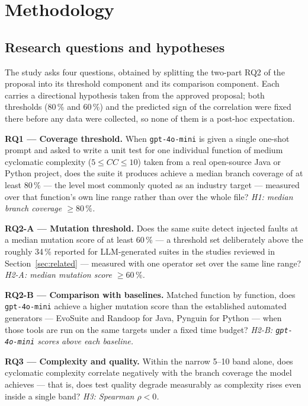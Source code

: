\section{Methodology}\label{sec:method}

\subsection{Research questions and hypotheses}\label{sec:rqs}

The study asks four questions, obtained by splitting the two-part RQ2 of the proposal into
its threshold component and its comparison component. Each carries a directional hypothesis
taken from the approved proposal; both thresholds (80\,\% and 60\,\%) and the predicted sign
of the correlation were fixed there before any data were collected, so none of them is a
post-hoc expectation.

\textbf{RQ1 --- Coverage threshold.} When \texttt{gpt-4o-mini} is given a single one-shot
prompt and asked to write a unit test for one individual function of medium cyclomatic
complexity ($5 \le CC \le 10$) taken from a real open-source Java or Python project, does the
suite it produces achieve a median branch coverage of at least 80\,\% --- the level most
commonly quoted as an industry target --- measured over that function's own line range rather
than over the whole file?
\emph{H1: median branch coverage $\ge 80\,\%$.}

\textbf{RQ2-A --- Mutation threshold.} Does the same suite detect injected faults at a median
mutation score of at least 60\,\% --- a threshold set deliberately above the roughly 34\,\%
reported for LLM-generated suites in the studies reviewed in Section~\ref{sec:related} ---
measured with one operator set over the same line range?
\emph{H2-A: median mutation score $\ge 60\,\%$.}

\textbf{RQ2-B --- Comparison with baselines.} Matched function by function, does
\texttt{gpt-4o-mini} achieve a higher mutation score than the established automated generators
--- EvoSuite and Randoop for Java, Pynguin for Python --- when those tools are run on the same
targets under a fixed time budget?
\emph{H2-B: \texttt{gpt-4o-mini} scores above each baseline.}

\textbf{RQ3 --- Complexity and quality.} Within the narrow 5--10 band alone, does cyclomatic
complexity correlate negatively with the branch coverage the model achieves --- that is, does
test quality degrade measurably as complexity rises even inside a single band?
\emph{H3: Spearman $\rho < 0$.}

